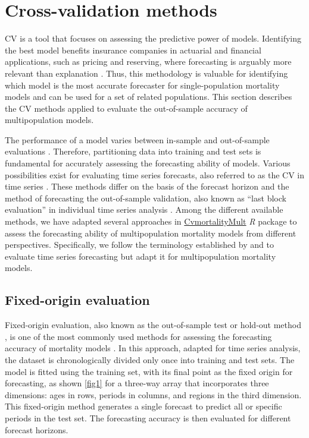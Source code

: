 \section{Cross-validation methods}
\label{sCV}

CV is a tool that focuses on assessing the predictive power of models. Identifying the best model benefits insurance companies in actuarial and financial applications, such as pricing and reserving, where forecasting is arguably more relevant than explanation \citep{Sridaran2022}. Thus, this methodology is valuable for identifying which model is the most accurate forecaster for single-population mortality models \citep{Atance2020} and can be used for a set of related populations. This section describes the CV methods \citep{Bur1989, Berg2012} applied to evaluate the out-of-sample accuracy of multipopulation models.

The performance of a model varies between in-sample and out-of-sample evaluations \citep{Bartolomei1989, Pant1990}. Therefore, partitioning data into training and test sets is fundamental for accurately assessing the forecasting ability of models. Various possibilities exist for evaluating time series forecasts, also referred to as the CV in time series \citep{Hastie2009}. These methods differ on the basis of the forecast horizon and the method of forecasting the out-of-sample validation, also known as ``last block evaluation'' in individual time series analysis \citep{Tashman2000, Berg2012}. Among the different available methods, we have adapted several approaches in \href{https://cran.r-project.org/web/packages/CvmortalityMult/index.html}{CvmortalityMult} \emph{R} package to assess the forecasting ability of multipopulation mortality models from different perspectives. Specifically, we follow the terminology established by \citet{Tashman2000} and \citet{Berg2012} to evaluate time series forecasting but adapt it for multipopulation mortality models.

\subsection{Fixed-origin evaluation}

Fixed-origin evaluation, also known as the out-of-sample test or hold-out method \citep{Lachenbruch1968, Tashman2000}, is one of the most commonly used methods for assessing the forecasting accuracy of mortality models \citep{Ahcan2014, Atance2020const}. In this approach, adapted for time series analysis, the dataset is chronologically divided only once into training and test sets. The model is fitted using the training set, with its final point as the fixed origin for forecasting, as shown \autoref{fig1} for a three-way array that incorporates three dimensions: ages in rows, periods in columns, and regions in the third dimension. This fixed-origin method generates a single forecast to predict all or specific periods in the test set. The forecasting accuracy is then evaluated for different forecast horizons.

